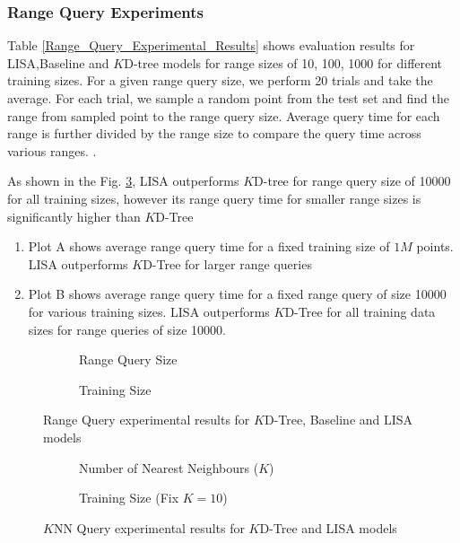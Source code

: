\subsubsection {Range Query Experiments}
Table \ref{Range_Query_Experimental_Results} shows evaluation results for LISA,Baseline and $K$D-tree models for range sizes of 10, 100, 1000 for different training sizes. For a given range query size, we perform 20 trials and take the average. For each trial, we sample a random point from the test set and find the range from sampled point to the range query size. Average query time for each range is further divided by the range size to compare the query time across various ranges. .

	As shown in the Fig. \ref{fig:Range_Query_Comparision}, LISA outperforms $K$D-tree for range query size of 10000 for all training sizes, however its range query time for smaller range sizes is significantly higher than $K$D-Tree
	\begin{enumerate}
		\item Plot A shows average range query time for a fixed training size of $1M$ points. LISA outperforms $K$D-Tree for larger range queries
		
		\item  Plot B shows average range query time for a fixed range query of size 10000 for various training sizes. LISA outperforms $K$D-Tree for all training data sizes for range queries of size 10000.
	\end{enumerate}

\begin{figure}
 \centering
     \begin{subfigure}[b]{0.45\textwidth}
         \centering
         
         \caption{Range Query Size}
         \label{fig:2d_exp2_2_1}
     \end{subfigure}
     \hfill
     \begin{subfigure}[b]{0.45\textwidth}
         \centering
         
         \caption{Training Size}
         \label{fig:2d_exp2_2_2}
     \end{subfigure}
     \hfill
     \caption{Range Query experimental results for $K$D-Tree, Baseline and LISA models}
        \label{fig:Range_Query_Comparision}
\end{figure}

\begin{figure}
 \centering
     \begin{subfigure}[h]{0.45\textwidth}
         \centering
         
         \caption{Number of Nearest Neighbours ($K$)}
         \label{fig:2d_exp2_3_1}
     \end{subfigure}
     \begin{subfigure}[h]{0.45\textwidth}
         \centering
         
         \caption{Training Size (Fix $K=10$)}
         \label{fig:2d_exp2_3_2}
     \end{subfigure}
     \caption{$K$NN Query experimental results for $K$D-Tree and LISA models}
      \label{fig:KNN_Query_Comparision}
\end{figure}

